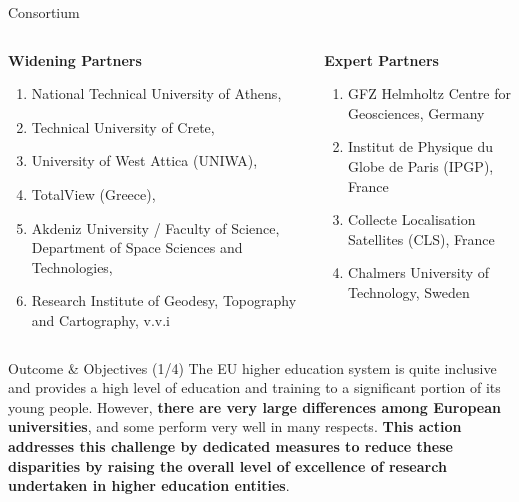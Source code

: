 \documentclass{beamer}
\begin{document}
\begin{frame}{Consortium}
\begin{columns}

  \begin{column}{0.48\textwidth}
    \textbf{Widening Partners}

    \begin{enumerate}
      \item National Technical University of Athens,
      \item Technical University of Crete,
      \item University of West Attica (UNIWA),
      \item TotalView (Greece),
      \item Akdeniz University / Faculty of Science, Department of Space Sciences and Technologies,
      \item Research Institute of Geodesy, Topography and Cartography, v.v.i
    \end{enumerate}
  \end{column}

  \begin{column}{0.48\textwidth}
    \textbf{Expert Partners}
    \begin{enumerate}
    \item GFZ Helmholtz Centre for Geosciences, Germany
    \item Institut de Physique du Globe de Paris (IPGP), France
    \item Collecte Localisation Satellites (CLS), France
    \item Chalmers University of Technology, Sweden
    \end{enumerate}
  \end{column}

\end{columns}
\end{frame}

\begin{frame}{Outcome \& Objectives (1/4)}
The EU higher education system is quite inclusive and provides a high level of
education and training to a significant portion of its young people. However, 
\textbf{there are very large differences among European universities}, and 
some perform very well in many respects. \textbf{This action addresses this 
challenge by dedicated measures to reduce these disparities by
raising the overall level of excellence of research undertaken in higher education entities}.
\end{frame}
\end{document}

